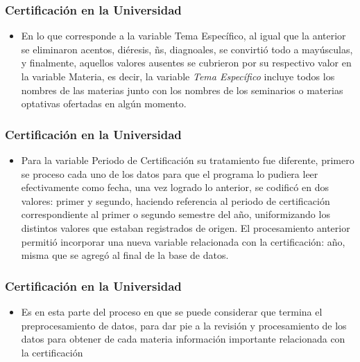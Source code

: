 \documentclass[xcolor=dvipsnames]{beamer}
\begin{document}
\begin{frame}\frametitle{Certificaci\'on en la Universidad}
\begin{itemize}

\item En lo que corresponde a la variable Tema Espec\'ifico, al igual que la anterior se eliminaron acentos, di\'eresis, \~ns, diagnoales, se convirti\'o todo a may\'usculas, y finalmente, aquellos valores ausentes se cubrieron por su respectivo valor en la variable Materia, es decir, la variable \textit{Tema Espec\'ifico} incluye todos los nombres de las materias junto con los nombres de los seminarios o materias optativas ofertadas en alg\'un momento.
 

\end{itemize}

                  



\end{frame}


\begin{frame}\frametitle{Certificaci\'on en la Universidad}
\begin{itemize}

\item Para la variable Periodo de Certificaci\'on su tratamiento fue diferente, primero se proceso cada uno de los datos para que el programa lo pudiera leer efectivamente como fecha, una vez logrado lo anterior, se codific\'o en dos valores: primer y segundo, haciendo referencia al periodo de certificaci\'on correspondiente al primer o segundo semestre del a\~no, uniformizando los distintos valores que estaban registrados de origen. El procesamiento anterior permiti\'o incorporar una nueva variable relacionada con la certificaci\'on: a\~no, misma que se agreg\'o al final de la base de datos.



\end{itemize}

\end{frame}


\begin{frame}\frametitle{Certificaci\'on en la Universidad}
\begin{itemize}

\item Es en esta parte del proceso en que se puede considerar que termina el preprocesamiento de datos, para dar pie a la revisi\'on y procesamiento de los datos para obtener de cada materia informaci\'on importante relacionada con la certificaci\'on
\end{itemize}

\end{frame}
\end{document}
